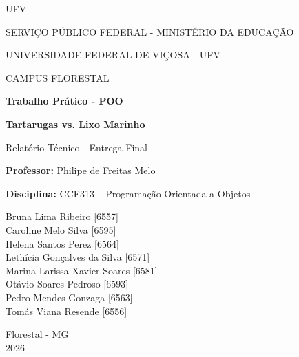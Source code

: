 \documentclass[11pt,a4paper]{article}
\begin{document}
\begin{titlepage}
\centering
\vspace*{0.2cm}
{\fontsize{40}{44}\selectfont\sffamily U\textcolor[HTML]{861D23}{F}\textcolor[HTML]{C9A733}{V}\par}
\vspace{0.2cm}
{\small SERVIÇO PÚBLICO FEDERAL - MINISTÉRIO DA EDUCAÇÃO\par}
\vspace{0.15cm}
{\small UNIVERSIDADE FEDERAL DE VIÇOSA - UFV\par}
\vspace{0.15cm}
{\small CAMPUS FLORESTAL\par}
\vspace{3.5cm}
{\Large\bfseries Trabalho Prático - POO\par}
\vspace{0.4cm}
{\large\bfseries Tartarugas vs. Lixo Marinho\par}
\vspace{0.2cm}
{\normalsize Relatório Técnico - Entrega Final\par}
\vspace{0.4cm}
{\small\textbf{Professor:} Philipe de Freitas Melo\par}
{\small\textbf{Disciplina:} CCF313 -- Programação Orientada a Objetos\par}
\vspace{1.8cm}
\begin{flushright}
Bruna Lima Ribeiro [6557]\\[3pt]
Caroline Melo Silva [6595]\\[3pt]
Helena Santos Perez [6564]\\[3pt]
Lethícia Gonçalves da Silva [6571]\\[3pt]
Marina Larissa Xavier Soares [6581]\\[3pt]
Otávio Soares Pedroso [6593]\\[3pt]
Pedro Mendes Gonzaga [6563]\\[3pt]
Tomás Viana Resende [6556]\\[3pt]
\end{flushright}
\vfill
Florestal - MG\\[7pt]
2026
\end{titlepage}

\tableofcontents
\newpage

\end{document}

